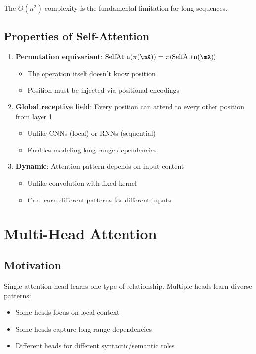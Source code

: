 The $O(n^2)$ complexity is the fundamental limitation for long sequences.

\subsection{Properties of Self-Attention}

\begin{enumerate}
    \item \textbf{Permutation equivariant}: $\text{SelfAttn}(\pi(\mX)) = \pi(\text{SelfAttn}(\mX))$
    \begin{itemize}
        \item The operation itself doesn't know position
        \item Position must be injected via positional encodings
    \end{itemize}

    \item \textbf{Global receptive field}: Every position can attend to every other position from layer 1
    \begin{itemize}
        \item Unlike CNNs (local) or RNNs (sequential)
        \item Enables modeling long-range dependencies
    \end{itemize}

    \item \textbf{Dynamic}: Attention pattern depends on input content
    \begin{itemize}
        \item Unlike convolution with fixed kernel
        \item Can learn different patterns for different inputs
    \end{itemize}
\end{enumerate}

\section{Multi-Head Attention}
\label{sec:multi_head}

\subsection{Motivation}

Single attention head learns one type of relationship. Multiple heads learn diverse patterns:
\begin{itemize}
    \item Some heads focus on local context
    \item Some heads capture long-range dependencies
    \item Different heads for different syntactic/semantic roles
\end{itemize}

